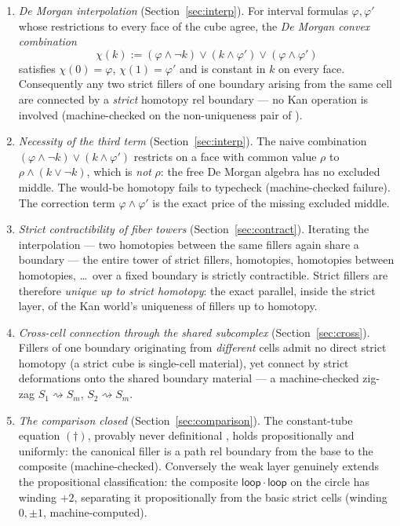\documentclass[11pt]{amsart}
\theoremstyle{definition}
\begin{document}
\begin{enumerate}
\item \emph{De Morgan interpolation}
  (Section~\ref{sec:interp}).  For interval formulas
  $\varphi, \varphi'$ whose restrictions to every face of the cube
  agree, the \emph{De Morgan convex combination}
  \[
    \chi(k) := (\varphi \wedge \neg k) \vee (k \wedge \varphi')
    \vee (\varphi \wedge \varphi')
  \]
  satisfies $\chi(0) = \varphi$, $\chi(1) = \varphi'$ and is
  constant in $k$ on every face.  Consequently any two strict
  fillers of one boundary arising from the same cell are connected
  by a \emph{strict} homotopy rel boundary --- no Kan operation is
  involved (machine-checked on the non-uniqueness pair of
  \cite{Realization}).
\item \emph{Necessity of the third term}
  (Section~\ref{sec:interp}).  The naive combination
  $(\varphi \wedge \neg k) \vee (k \wedge \varphi')$ restricts on a
  face with common value $\rho$ to $\rho \wedge (k \vee \neg k)$,
  which is \emph{not} $\rho$: the free De Morgan algebra has no
  excluded middle.  The would-be homotopy fails to typecheck
  (machine-checked failure).  The correction term
  $\varphi \wedge \varphi'$ is the exact price of the missing
  excluded middle.
\item \emph{Strict contractibility of fiber towers}
  (Section~\ref{sec:contract}).  Iterating the interpolation ---
  two homotopies between the same fillers again share a boundary
  --- the entire tower of strict fillers, homotopies, homotopies
  between homotopies, \dots\ over a fixed boundary is strictly
  contractible.  Strict fillers are therefore \emph{unique up to
  strict homotopy}: the exact parallel, inside the strict layer, of
  the Kan world's uniqueness of fillers up to homotopy.
\item \emph{Cross-cell connection through the shared subcomplex}
  (Section~\ref{sec:cross}).  Fillers of one boundary originating
  from \emph{different} cells admit no direct strict homotopy (a
  strict cube is single-cell material), yet connect by strict
  deformations onto the shared boundary material --- a
  machine-checked zig-zag
  $S_1 \rightsquigarrow S_m$, $S_2 \rightsquigarrow S_m$.
\item \emph{The comparison closed}
  (Section~\ref{sec:comparison}).  The constant-tube equation
  $(\dagger)$, provably never definitional \cite{Const}, holds
  propositionally and uniformly: the canonical filler is a path rel
  boundary from the base to the composite (machine-checked).
  Conversely the weak layer genuinely extends the propositional
  classification: the composite $\mathsf{loop} \cdot \mathsf{loop}$
  on the circle has winding $+2$, separating it propositionally
  from the basic strict cells (winding $0, \pm 1$,
  machine-computed).
\end{enumerate}
\end{document}
